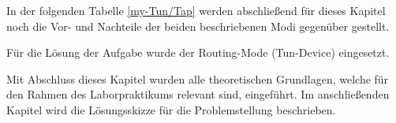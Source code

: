 \documentclass[
a4paper,     %
 headsepline, %
footsepline, %
titlepage,   %
 halfparskip,     %
 fleqn,       %
12pt         %
]{scrartcl}  %
\begin{document}
In der folgenden Tabelle \ref{my-Tun/Tap} werden abschließend für dieses Kapitel noch die Vor- und Nachteile der beiden beschriebenen Modi gegenüber gestellt. 
\newpage
\begin{table}[!h]
\centering
{}
\caption{Bridging-Mode vs. Routing-Mode}
\label{my-Tun/Tap}
\end{table}

Für die Lösung der Aufgabe wurde der Routing-Mode (Tun-Device) eingesetzt. 

Mit Abschluss dieses Kapitel wurden alle theoretischen Grundlagen, welche für den Rahmen des Laborpraktikums relevant sind, eingeführt. Im anschließenden Kapitel wird die Lösungsskizze für die Problemstellung beschrieben. 
 
\label{Lösungsskizze}
\label{Auswertung}
\end{document}

